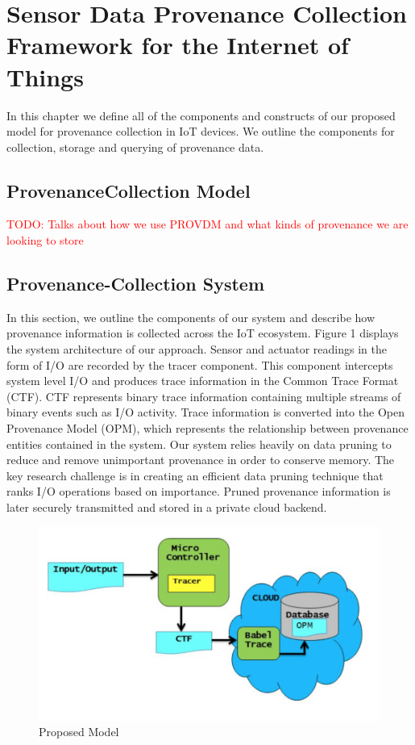 
\chapter{Sensor Data Provenance Collection Framework for the Internet of Things}

In this chapter we define all of the components and constructs of our proposed model for provenance collection in IoT devices. We outline the components for collection, storage and querying of provenance data.

\section{Provenance\-Collection Model}

\textcolor{red}{TODO: Talks about how we use PROV\-DM and what kinds of provenance we are looking to store}

\section{Provenance-Collection System}

In this section, we outline the components of our system and describe how provenance information is collected across the IoT ecosystem. Figure 1 displays the system architecture of our approach. Sensor and actuator readings in the form of I/O are recorded by the tracer component. This component intercepts system level I/O and produces trace information in the Common Trace Format (CTF). CTF represents binary trace information containing multiple streams of binary events such as I/O activity. Trace information is converted into the Open Provenance Model (OPM), which represents the relationship between provenance entities contained in the system. Our system relies heavily on data pruning to reduce and remove unimportant provenance in order to conserve memory. The key research challenge is in creating an efficient data pruning technique that ranks I/O operations based on importance. Pruned provenance information is later securely transmitted and stored in a private cloud backend.

\begin{figure}[h]
\begin{center}

\includegraphics{architecture.PNG}    
\end{center}
\caption{Proposed Model}
\label{autom}
\end{figure}

